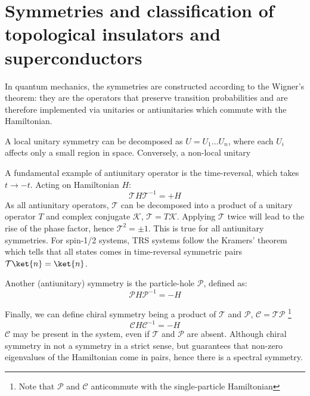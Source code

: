 \section{Symmetries and classification of topological insulators and superconductors}



In quantum mechanics, the symmetries are constructed according to the Wigner's theorem: they are the operators that preserve transition probabilities and are therefore implemented via unitaries or antiunitaries which commute with the Hamiltonian. 

A local unitary symmetry can be decomposed as $U = U_1 \ldots U_n$, where each $U_i$ affects only a small region in space. Conversely, a non-local unitary 

A fundamental example of antiunitary operator is the time-reversal, which takes $t \rightarrow -t$. Acting on Hamiltonian $H$:
\begin{equation}
\mathcal{T}  H \mathcal{T}^{-1} = + H
\end{equation}
As all antiunitary operators, $\mathcal{T}$ can be decomposed into a product of a unitary operator $T$ and complex conjugate $\mathcal{K}$, $\mathcal{T} = T \mathcal{K}$. Applying $\mathcal{T}$ twice will lead to the rise of the phase factor, hence $\mathcal{T}^2 = \pm 1$. This is true for all antiunitary symmetries. For spin-1/2 systems, TRS systems follow the Kramers' theorem which tells that all states comes in time-reversal symmetric pairs $\mathcal{T} \ket{n} = \ket{n}$.

Another (antiunitary) symmetry is the particle-hole $\mathcal{P}$, defined as:
\begin{equation}
\mathcal{P}  H \mathcal{P}^{-1} = - H
\end{equation}

Finally, we can define chiral symmetry being a product of $\mathcal{T}$ and $\mathcal{P}$, $\mathcal{C}= \mathcal{TP}$ \footnote{Note that $\mathcal{P}$ and $\mathcal{C}$ anticommute with the single-particle Hamiltonian}
\begin{equation}
\mathcal{C}  H \mathcal{C}^{-1} = - H
\end{equation}
$\mathcal{C}$ may be present in the system, even if $\mathcal{T}$ and $\mathcal{P}$ are absent. Although chiral symmetry in not a symmetry in a strict sense, but guarantees that non-zero eigenvalues of the Hamiltonian come in pairs, hence there is a spectral symmetry.




